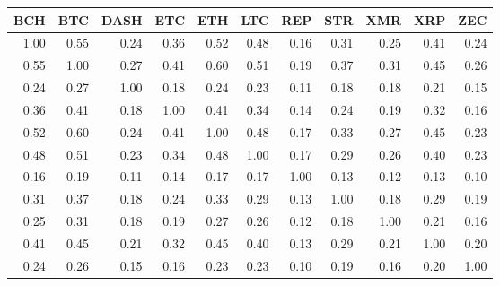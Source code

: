 \begin{tabular}{rrrrrrrrrrr}
  \toprule
BCH & BTC & DASH & ETC & ETH & LTC & REP & STR & XMR & XRP & ZEC \\ 
  \midrule
1.00 & 0.55 & 0.24 & 0.36 & 0.52 & 0.48 & 0.16 & 0.31 & 0.25 & 0.41 & 0.24 \\ 
  0.55 & 1.00 & 0.27 & 0.41 & 0.60 & 0.51 & 0.19 & 0.37 & 0.31 & 0.45 & 0.26 \\ 
  0.24 & 0.27 & 1.00 & 0.18 & 0.24 & 0.23 & 0.11 & 0.18 & 0.18 & 0.21 & 0.15 \\ 
  0.36 & 0.41 & 0.18 & 1.00 & 0.41 & 0.34 & 0.14 & 0.24 & 0.19 & 0.32 & 0.16 \\ 
  0.52 & 0.60 & 0.24 & 0.41 & 1.00 & 0.48 & 0.17 & 0.33 & 0.27 & 0.45 & 0.23 \\ 
  0.48 & 0.51 & 0.23 & 0.34 & 0.48 & 1.00 & 0.17 & 0.29 & 0.26 & 0.40 & 0.23 \\ 
  0.16 & 0.19 & 0.11 & 0.14 & 0.17 & 0.17 & 1.00 & 0.13 & 0.12 & 0.13 & 0.10 \\ 
  0.31 & 0.37 & 0.18 & 0.24 & 0.33 & 0.29 & 0.13 & 1.00 & 0.18 & 0.29 & 0.19 \\ 
  0.25 & 0.31 & 0.18 & 0.19 & 0.27 & 0.26 & 0.12 & 0.18 & 1.00 & 0.21 & 0.16 \\ 
  0.41 & 0.45 & 0.21 & 0.32 & 0.45 & 0.40 & 0.13 & 0.29 & 0.21 & 1.00 & 0.20 \\ 
  0.24 & 0.26 & 0.15 & 0.16 & 0.23 & 0.23 & 0.10 & 0.19 & 0.16 & 0.20 & 1.00 \\ 
   \bottomrule
\end{tabular}
